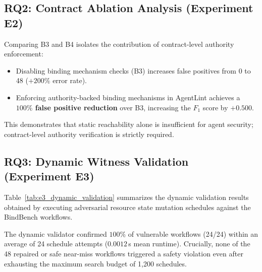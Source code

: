 \subsection{RQ2: Contract Ablation Analysis (Experiment E2)}
Comparing B3 and B4 isolates the contribution of contract-level authority enforcement:
\begin{itemize}
    \item Disabling binding mechanism checks (B3) increases false positives from 0 to 48 ($+200\%$ error rate).
    \item Enforcing authority-backed binding mechanisms in AgentLint achieves a \textbf{$100\%$ false positive reduction} over B3, increasing the $F_1$ score by $+0.500$.
\end{itemize}
This demonstrates that static reachability alone is insufficient for agent security; contract-level authority verification is strictly required.

\subsection{RQ3: Dynamic Witness Validation (Experiment E3)}
Table~\ref{tab:e3_dynamic_validation} summarizes the dynamic validation results obtained by executing adversarial resource state mutation schedules against the \textsf{BindBench} workflows.

\begin{table}[h]
\centering
\caption{Dynamic Witness Validation Outcomes (Experiment E3)}
\label{tab:e3_dynamic_validation}
\end{table}

The dynamic validator confirmed $100\%$ of vulnerable workflows (24/24) within an average of 24 schedule attempts ($0.0012$\,s mean runtime). Crucially, none of the 48 repaired or safe near-miss workflows triggered a safety violation even after exhausting the maximum search budget of 1,200 schedules.


